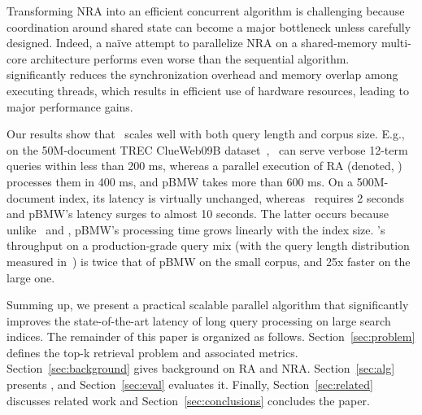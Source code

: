 Transforming NRA into an efficient concurrent algorithm is challenging because coordination around 
shared state can become a major bottleneck unless carefully designed. Indeed, 
a na\"ive attempt to parallelize NRA on a shared-memory multi-core architecture  
performs even worse than the sequential algorithm. \alg\ 
significantly reduces the synchronization 
overhead and memory overlap among executing threads, which results in efficient use 
of hardware resources, leading to major performance gains. 

Our results show that \alg\ scales well with both query length and corpus size.
E.g., on the 50M-document TREC ClueWeb09B dataset~\cite{ClueWeb09}, %
\alg\ can serve verbose 12-term queries within less than 200 ms, 
whereas a parallel execution of RA (denoted, \pRA) processes them in 400 ms, and pBMW takes more than 600 ms. 
On a 500M-document index,  its latency is virtually unchanged, whereas 
 \pRA\ requires 2 seconds and pBMW's latency surges to almost 10 seconds.  The latter occurs because unlike \alg\ and \pRA, 
pBMW's processing time grows linearly with the index size.
\alg's throughput on a production-grade query mix (with the query length distribution measured in~\cite{sigir/Guy16}) is twice that of pBMW on the small corpus, and 25x faster on the large one.


Summing up, we present a practical scalable parallel algorithm that significantly improves the state-of-the-art latency  of long query processing
on large search indices.
The remainder of this paper is organized as follows. Section~\ref{sec:problem} defines the top-k retrieval problem and associated metrics. 
Section~\ref{sec:background} gives background on RA and NRA. 
Section~\ref{sec:alg} presents \alg, and Section~\ref{sec:eval}  evaluates it.
Finally, 
Section~\ref{sec:related} discusses related work and Section~\ref{sec:conclusions} concludes the paper.